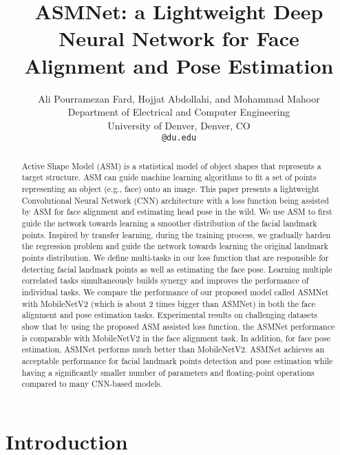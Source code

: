 \documentclass[final]{cvpr}
\begin{document}
\title{ASMNet: a Lightweight Deep Neural Network for Face Alignment and Pose Estimation }
\author{
Ali Pourramezan Fard, Hojjat Abdollahi, and Mohammad Mahoor\\
Department of Electrical and Computer Engineering\\
University of Denver, Denver, CO\\
{\tt\small @du.edu}
}


\maketitle




\begin{abstract}
Active Shape Model (ASM) is a statistical model of object shapes that represents a target structure. ASM can guide machine learning algorithms to fit a set of points representing an object (e.g., face) onto an image. This paper presents a lightweight Convolutional Neural Network (CNN) architecture with a loss function being assisted by ASM for face alignment and estimating head pose in the wild. We use ASM to first guide the network towards learning a smoother distribution of the facial landmark points. Inspired by transfer learning, during the training process, we gradually harden the regression problem and guide the network towards learning the original landmark points distribution. We define multi-tasks in our loss function that are responsible for detecting facial landmark points as well as estimating the face pose. Learning multiple correlated tasks simultaneously builds synergy and improves the performance of individual tasks. We compare the performance of our proposed model called ASMNet with MobileNetV2 (which is about 2 times bigger than ASMNet) in both the face alignment and pose estimation tasks. Experimental results on challenging datasets show that by using the proposed ASM assisted loss function, the ASMNet performance is comparable with MobileNetV2 in the face alignment task. In addition, for face pose estimation, ASMNet performs much better than MobileNetV2. ASMNet achieves an acceptable performance for facial landmark points detection and pose estimation while having a significantly smaller number of parameters and floating-point operations compared to many CNN-based models.
\end{abstract}



\section{Introduction}\label{sec:intro}
\end{document}
